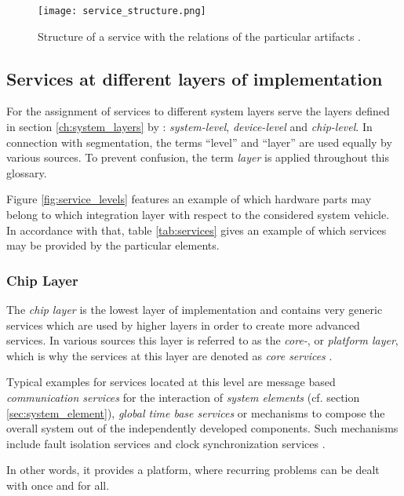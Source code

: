 \begin{figure}[ht]
\centering
\texttt{[image: service\_structure.png]}
\caption{Structure of a service with the relations of the particular artifacts \cite[p.45]{krafzig}.}
\label{fig:service}
\end{figure}





\subsection{Services at different layers of implementation}
\label{ch:service_layers}
For the assignment of services to different system layers serve the layers defined in section \ref{ch:system_layers} by \cite{genesys}: \emph{system-level}, \emph{device-level} and \emph{chip-level}. In connection with segmentation, the terms ``level'' and ``layer'' are used equally by various sources. To prevent confusion, the term \emph{layer} is applied throughout this glossary.

Figure \ref{fig:service_levels} features an example of which hardware parts may belong to which integration layer with respect to the considered system vehicle. In accordance with that, table \ref{tab:services} gives an example of which services may be provided by the particular elements.

\subsubsection{Chip Layer}
The \emph{chip layer} is the lowest layer of implementation and contains very generic services which are used by higher layers in order to create more advanced services. In various sources this layer is referred to as the \emph{core-}, or \emph{platform layer}, which is why the services at this layer are denoted as \emph{core services} \cite[p.44]{genesys}.

Typical examples for services located at this level are message based 
\emph{communication services} for the interaction of \emph{system elements} (cf. section \ref{sec:system_element}), \emph{global time base services} or mechanisms to compose the overall system out of the independently developed components. Such mechanisms include fault isolation services and clock synchronization services \cite[p.7-12]{genesys}.

In other words, it provides a platform, where recurring problems can be dealt with once and for all.

